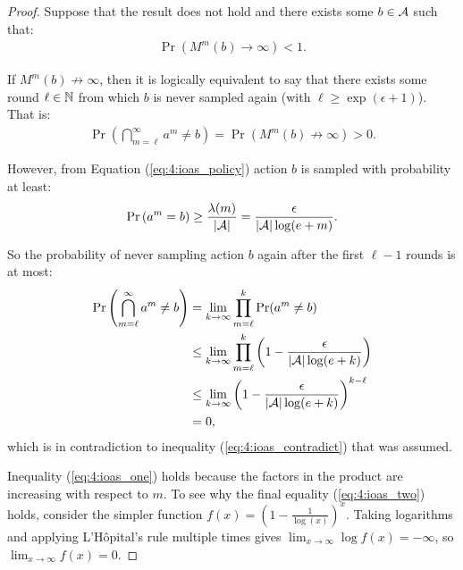     \begin{proof} 
        Suppose that the result does not hold and there exists some $b\in\mathcal{A}$ such that:
        \begin{align}
            \Pr\left(M^m(b) \rightarrow \infty\right) < 1.
        \end{align}

        If $M^m(b) \not\rightarrow \infty$, then it is logically equivalent to say that there exists some round $\ell\in\mathbb{N}$ from which $b$ is never sampled again (with $\ell \geq \exp(\epsilon+1)$). That is:
        \begin{align}
            \Pr\left(\bigcap_{m=\ell}^\infty a^m \neq b\right)
                = \Pr\left(M^m(b) \not\rightarrow \infty\right) 
                > 0. \label{eq:4:ioas_contradict}
        \end{align}

        However, from Equation (\ref{eq:4:ioas_policy}) action $b$ is sampled with probability at least:
        \begin{align}
            \Pr\left(a^m = b\right) \geq \frac{\lambda(m)}{|\mathcal{A}|} = \frac{\epsilon}{|\mathcal{A}| \log(e+m)}.
        \end{align} 

        So the probability of never sampling action $b$ again after the first $\ell-1$ rounds is at most:
        \begin{align}
            \Pr\left(\bigcap_{m=\ell}^\infty a^m \neq b \right)
                &= \lim_{k\rightarrow\infty} \prod_{m=\ell}^k 
                    \Pr(a^m \neq b) \\
                &\leq \lim_{k\rightarrow\infty} \prod_{m=\ell}^k 
                    \left( 1 - \frac{\epsilon}{|\mathcal{A}|\log(e+k)} \right) \\
                &\leq \lim_{k\rightarrow\infty} 
                    \left( 1 - \frac{\epsilon}{|\mathcal{A}|\log(e+k)} \right)^{k-\ell} \label{eq:4:ioas_one} \\
                &= 0, \label{eq:4:ioas_two}
        \end{align}
        which is in contradiction to inequality (\ref{eq:4:ioas_contradict}) that was assumed. 
        
        Inequality (\ref{eq:4:ioas_one}) holds because the factors in the product are increasing with respect to $m$. To see why the final equality (\ref{eq:4:ioas_two}) holds, consider the simpler function $f(x)=\left(1-\frac{1}{\log(x)}\right)^x$. Taking logarithms and applying L'H\^{o}pital's rule multiple times gives $\lim_{x\rightarrow\infty} \log f(x) = -\infty$, so $\lim_{x\rightarrow\infty} f(x) = 0$.
        

\end{proof}
